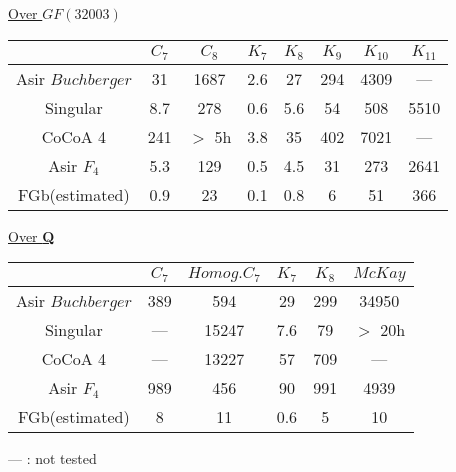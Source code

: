 \documentclass{slides}
\begin{document}
\begin{slide}{}

\underline{Over $GF(32003)$}
\begin{center}
\begin{tabular}{|c||c|c|c|c|c|c|c|} \hline
		& $C_7$ & $C_8$ & $K_7$ & $K_8$ & $K_9$ & $K_{10}$ & $K_{11}$ \\ \hline
Asir $Buchberger$ 	& 31 & 1687  & 2.6  & 27 & 294  & 4309 & --- \\ \hline
Singular & 8.7 & 278 & 0.6 & 5.6 & 54 & 508 & 5510 \\ \hline
CoCoA 4 & 241 & $>$ 5h & 3.8 & 35 & 402 &7021  & --- \\ \hline\hline
Asir $F_4$ 	& 5.3 & 129 & 0.5  & 4.5 & 31  & 273 & 2641 \\ \hline
FGb(estimated)	& 0.9 & 23 & 0.1 & 0.8 & 6 & 51 & 366 \\ \hline
\end{tabular}
\end{center}

\underline{Over {\bf Q}}

\begin{center}
\begin{tabular}{|c||c|c|c|c|c|} \hline
		& $C_7$ & $Homog. C_7$ & $K_7$ & $K_8$ & $McKay$ \\ \hline
Asir $Buchberger$ 	& 389 & 594 & 29 & 299 & 34950 \\ \hline
Singular & --- & 15247 & 7.6 & 79 & $>$ 20h \\ \hline
CoCoA 4 & --- & 13227 & 57 & 709 & --- \\ \hline\hline
Asir $F_4$ 	&  989 & 456 & 90 & 991 & 4939 \\ \hline
FGb(estimated)	& 8 &11 & 0.6 & 5 & 10 \\ \hline
\end{tabular}
\end{center}
--- : not tested
\end{slide}
\end{document}
